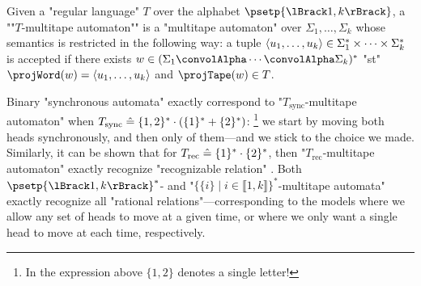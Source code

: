 Given a "regular language" $T$ over the alphabet $\psetp{\lBrack 1,k\rBrack}$,
a \AP""$T$-multitape automaton"" is a "multitape automaton" over $\Sigma_1,\dotsc,\Sigma_k$
whose semantics is restricted in the following way:
a tuple $\langle u_1,\dotsc,u_k\rangle \in \Sigma_1^* \times \cdots \times \Sigma_k^*$ is accepted
if there exists $w \in (\Sigma_1 \convolAlpha \cdots \convolAlpha \Sigma_k)^*$
"st" $\projWord(w) = \tup{u_1,\dotsc,u_k}$ and $\projTape(w) \in T$.

Binary "synchronous automata" exactly correspond to "$T_{\textrm{sync}}$-multitape automaton" when
$T_{\textrm{sync}} \mathrel{\hat{=}} \{1,2\}^* \cdot (\{1\}^* + \{2\}^*)$:%
\footnote{In the expression above $\{1,2\}$ denotes a single letter!}
we start by moving both heads synchronously, and then only of
them---and we stick to the choice we made.
Similarly, it can be shown
that for $T_{\textrm{rec}} \mathrel{\hat{=}} \{1\}^* \cdot \{2\}^*$, then "$T_{\textrm{rec}}$-multitape automaton" exactly recognize "recognizable relation"
\cite[Proposition~1]{FigueiraLibkin2015SynchronizingRelations}.
Both $\psetp{\lBrack 1,k\rBrack}^*$- and
"$\{\{i\} \mid i \in \lBrack 1,k\rBrack\}^*$-multitape automata"
exactly recognize all "rational relations"---corresponding to the models
where we allow any set of heads to move at a given time,
or where we only want a single head to move at each time, respectively.%

